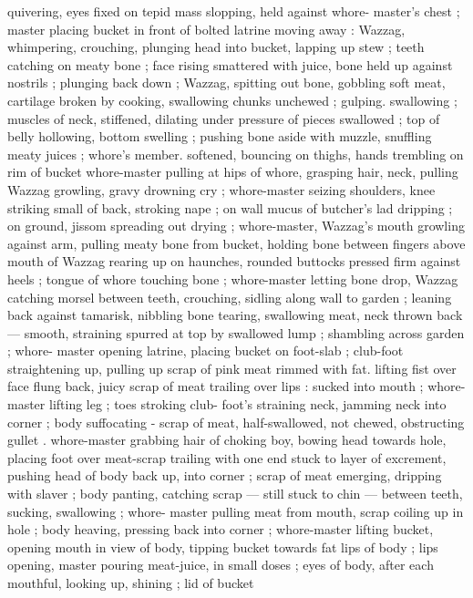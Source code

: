 quivering, eyes fixed on tepid mass slopping, held against whore- 
master's chest ; master placing bucket in front of bolted latrine 
moving away : Wazzag, whimpering, crouching, plunging head into 
bucket, lapping up stew ; teeth catching on meaty bone ; face rising 
smattered with juice, bone held up against nostrils ; plunging back 
down ; Wazzag, spitting out bone, gobbling soft meat, cartilage 
broken by cooking, swallowing chunks unchewed ; gulping. 
swallowing ; muscles of neck, stiffened, dilating under pressure of 
pieces swallowed ; top of belly hollowing, bottom swelling ; pushing 
bone aside with muzzle, snuffling meaty juices ; whore's member. 
softened, bouncing on thighs, hands trembling on rim of bucket 
whore-master pulling at hips of whore, grasping hair, neck, pulling 
Wazzag growling, gravy drowning cry ; whore-master seizing 
shoulders, knee striking small of back, stroking nape ; on wall 
mucus of butcher's lad dripping ; on ground, jissom spreading out 
drying ; whore-master, Wazzag's mouth growling against arm, pulling 
meaty bone from bucket, holding bone between fingers above mouth 
of Wazzag rearing up on haunches, rounded buttocks pressed firm 
against heels ; tongue of whore touching bone ; whore-master letting 
bone drop, Wazzag catching morsel between teeth, crouching, sidling 
along wall to garden ; leaning back against tamarisk, nibbling bone 
tearing, swallowing meat, neck thrown back --- smooth, straining 
spurred at top by swallowed lump ; shambling across garden ; whore- 
master opening latrine, placing bucket on foot-slab ; club-foot 
straightening up, pulling up scrap of pink meat rimmed with fat. 
lifting fist over face flung back, juicy scrap of meat trailing over lips 
: sucked into mouth ; whore-master lifting leg ; toes stroking club- 
foot's straining neck, jamming neck into corner ; body suffocating - 
scrap of meat, half-swallowed, not chewed, obstructing gullet . 
whore-master grabbing hair of choking boy, bowing head towards 
hole, placing foot over meat-scrap trailing with one end stuck to layer 
of excrement, pushing head of body back up, into corner ; scrap of 
meat emerging, dripping with slaver ; body panting, catching scrap 
--- still stuck to chin --- between teeth, sucking, swallowing ; whore- 
master pulling meat from mouth, scrap coiling up in hole ; body 
heaving, pressing back into corner ; whore-master lifting bucket, 
opening mouth in view of body, tipping bucket towards fat lips of 
body ; lips opening, master pouring meat-juice, in small doses ; eyes 
of body, after each mouthful, looking up, shining ; lid of bucket 
